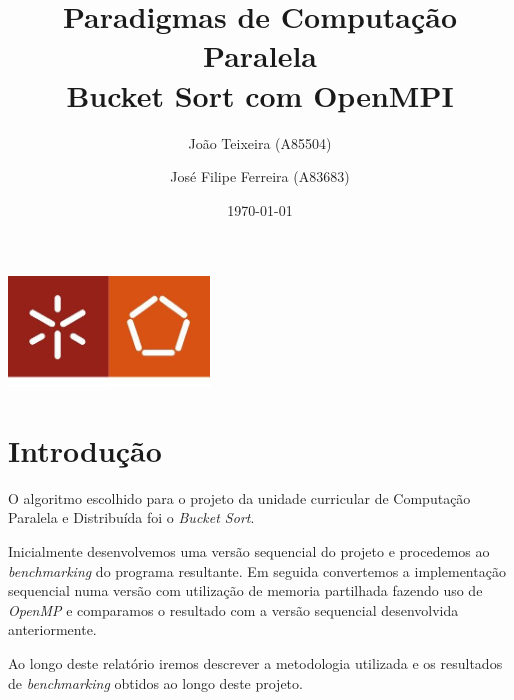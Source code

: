 \documentclass[a4paper]{report}
\begin{document}
\title{Paradigmas de Computação Paralela\\Bucket Sort com OpenMPI}
\author{João Teixeira (A85504) \and José Filipe Ferreira (A83683)}
\date{\today}

\begin{center}
    \begin{minipage}{0.75\linewidth}
        \centering
        \includegraphics[width=0.4\textwidth]{images/eng.jpeg}\par\vspace{1cm}
        \vspace{1.5cm}
        \href{https://www.uminho.pt/PT}
        {\color{black}{\scshape\LARGE Universidade do Minho}} \par
        \vspace{1cm}
        \href{https://www.di.uminho.pt/}
        {\color{black}{\scshape\Large Departamento de Informática}} \par
        \vspace{1.5cm}
        \maketitle
    \end{minipage}
\end{center}

\tableofcontents

\pagebreak

\chapter{Introdução}
O algoritmo escolhido para o projeto da unidade curricular de Computação
Paralela e Distribuída foi o \textit{Bucket Sort}.

Inicialmente desenvolvemos uma versão sequencial do projeto e procedemos ao
\textit{benchmarking} do programa resultante. Em seguida convertemos a
implementação sequencial numa versão com utilização de memoria partilhada
fazendo uso de \textit{OpenMP} e comparamos o resultado com a versão sequencial
desenvolvida anteriormente.

Ao longo deste relatório iremos descrever a metodologia utilizada e os
resultados de \textit{benchmarking} obtidos ao longo deste projeto.
\end{document}
